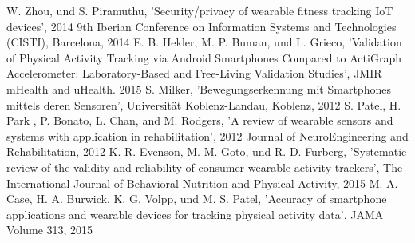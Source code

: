 \documentclass[conference]{IEEEtran}
\begin{document}
\begin{thebibliography}{00}
 W. Zhou, und S. Piramuthu, 'Security/privacy of wearable fitness tracking IoT devices', 2014 9th Iberian Conference on Information Systems and Technologies (CISTI), Barcelona, 2014
 E. B. Hekler, M. P. Buman, und L. Grieco, 'Validation of Physical Activity Tracking via Android Smartphones Compared to ActiGraph Accelerometer: Laboratory-Based and Free-Living Validation Studies', JMIR mHealth and uHealth. 2015
 S. Milker, 'Bewegungserkennung mit Smartphones mittels deren Sensoren', Universität Koblenz-Landau, Koblenz, 2012
 S. Patel, H. Park
, P. Bonato, L. Chan, and M. Rodgers, 'A review of wearable sensors and systems with application in rehabilitation', 2012 Journal of NeuroEngineering and Rehabilitation, 2012
 K. R. Evenson, M. M. Goto, und R. D. Furberg, 'Systematic review of the validity and reliability of consumer-wearable activity trackers', The International Journal of Behavioral Nutrition and Physical Activity, 2015
 M. A. Case, H. A. Burwick, K. G. Volpp, und M. S. Patel, 'Accuracy of smartphone applications and wearable devices for tracking physical activity data', JAMA Volume 313, 2015
\end{thebibliography}
\end{document}

